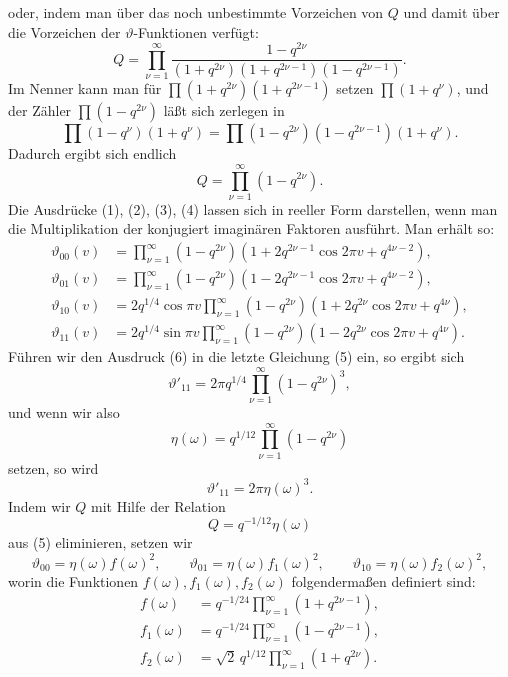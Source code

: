 \documentclass[11pt]{article}
\providecommand{\tht}{\vartheta}
\begin{document}
oder, indem man über das noch unbestimmte Vorzeichen von $Q$ und damit über die Vorzeichen der $\vartheta$-Funktionen verfügt:
\[
Q=\prod_{\nu=1}^{\infty}\frac{1-q^{2\nu}}{(1+q^{2\nu})(1+q^{2\nu-1})(1-q^{2\nu-1})}.
\]
Im Nenner kann man für $\prod(1+q^{2\nu})(1+q^{2\nu-1})$ setzen $\prod(1+q^\nu)$, und der Zähler $\prod(1-q^{2\nu})$ läßt sich zerlegen in
\[
\prod(1-q^\nu)(1+q^\nu)=\prod(1-q^{2\nu})(1-q^{2\nu-1})(1+q^\nu).
\]
Dadurch ergibt sich endlich
\begin{equation}
Q=\prod_{\nu=1}^{\infty}(1-q^{2\nu}).
\tag{6}
\end{equation}
Die Ausdrücke (1), (2), (3), (4) lassen sich in reeller Form darstellen, wenn man die Multiplikation der konjugiert imaginären Faktoren ausführt. Man erhält so:
\begin{equation}
\begin{aligned}
\tht_{00}(v)&=\prod_{\nu=1}^{\infty}(1-q^{2\nu})(1+2q^{2\nu-1}\cos2\pi v+q^{4\nu-2}),\\
\tht_{01}(v)&=\prod_{\nu=1}^{\infty}(1-q^{2\nu})(1-2q^{2\nu-1}\cos2\pi v+q^{4\nu-2}),\\
\tht_{10}(v)&=2q^{1/4}\cos\pi v\prod_{\nu=1}^{\infty}(1-q^{2\nu})(1+2q^{2\nu}\cos2\pi v+q^{4\nu}),\\
\tht_{11}(v)&=2q^{1/4}\sin\pi v\prod_{\nu=1}^{\infty}(1-q^{2\nu})(1-2q^{2\nu}\cos2\pi v+q^{4\nu}).
\end{aligned}
\tag{7}
\end{equation}
Führen wir den Ausdruck (6) in die letzte Gleichung (5) ein, so ergibt sich
\[
\tht'_{11}=2\pi q^{1/4}\prod_{\nu=1}^{\infty}(1-q^{2\nu})^3,
\]
und wenn wir also
\begin{equation}
\eta(\omega)=q^{1/12}\prod_{\nu=1}^{\infty}(1-q^{2\nu})
\tag{8}
\end{equation}
setzen, so wird
\begin{equation}
\tht'_{11}=2\pi\eta(\omega)^3.
\tag{9}
\end{equation}
Indem wir $Q$ mit Hilfe der Relation
\[
Q=q^{-1/12}\eta(\omega)
\]
aus (5) eliminieren, setzen wir
\begin{equation}
\tht_{00}=\eta(\omega)f(\omega)^2,
\qquad
\tht_{01}=\eta(\omega)f_1(\omega)^2,
\qquad
\tht_{10}=\eta(\omega)f_2(\omega)^2,
\tag{10}
\end{equation}
worin die Funktionen $f(\omega),f_1(\omega),f_2(\omega)$ folgendermaßen definiert sind:
\begin{equation}
\begin{aligned}
f(\omega)&=q^{-1/24}\prod_{\nu=1}^{\infty}(1+q^{2\nu-1}),\\
f_1(\omega)&=q^{-1/24}\prod_{\nu=1}^{\infty}(1-q^{2\nu-1}),\\
f_2(\omega)&=\sqrt2\,q^{1/12}\prod_{\nu=1}^{\infty}(1+q^{2\nu}).
\end{aligned}
\tag{11}
\end{equation}
\end{document}
